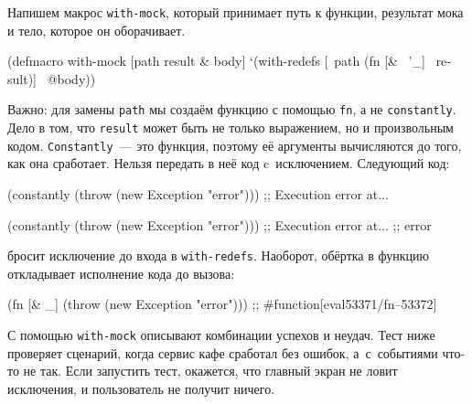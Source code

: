 Напишем макрос \verb|with-mock|, который принимает путь к функции, результат
мока и тело, которое он оборачивает.


\begin{english}
  \begin{clojure}
(defmacro with-mock
  [path result & body]
  `(with-redefs
     [~path (fn [& ~'_] ~result)]
     ~@body))
  \end{clojure}
\end{english}

Важно: для замены \verb|path| мы создаём функцию с помощью \verb|fn|, а не
\verb|constantly|. Дело в том, что \verb|result| может быть не только
выражением, но и произвольным кодом. \verb|Constantly|~--- это функция, поэтому её
аргументы вычисляются до того, как она сработает. Нельзя передать в неё код
c~исключением. Следующий код:

\ifnarrow

\begin{english}
  \begin{clojure}
(constantly
  (throw (new Exception "error")))
;; Execution error at...
  \end{clojure}
\end{english}

\else

\begin{english}
  \begin{clojure}
(constantly (throw (new Exception "error")))
;; Execution error at...
;; error
  \end{clojure}
\end{english}

\fi


\noindent
бросит исключение до входа в \verb|with-redefs|. Наоборот, обёртка в
функцию откладывает исполнение кода до вызова:

\begin{english}
  \begin{clojure}
(fn [& _] (throw (new Exception "error")))
;; #function[eval53371/fn--53372]
  \end{clojure}
\end{english}

С помощью \verb|with-mock| описывают комбинации успехов и неудач. Тест ниже
проверяет сценарий, когда сервис кафе сработал без ошибок, а~с~событиями что-то
не так. Если запустить тест, окажется, что главный экран не ловит исключения, и
пользователь не получит ничего.


